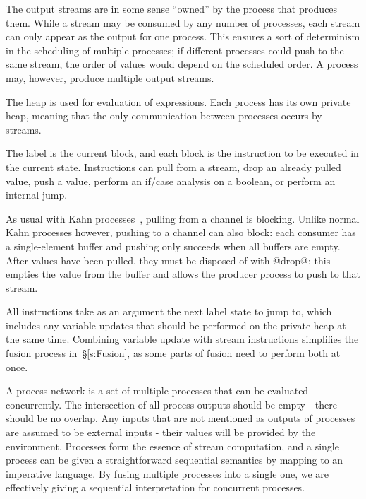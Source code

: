 The output streams are in some sense ``owned'' by the process that produces them.
While a stream may be consumed by any number of processes, each stream can only appear as the output for one process.
This ensures a sort of determinism in the scheduling of multiple processes; if different processes could push to the same stream, the order of values would depend on the scheduled order.
A process may, however, produce multiple output streams.

The heap is used for evaluation of expressions.
Each process has its own private heap, meaning that the only communication between processes occurs by streams.

The label is the current block, and each block is the instruction to be executed in the current state.
Instructions can pull from a stream, drop an already pulled value, push a value, perform an if/case analysis on a boolean, or perform an internal jump.

As usual with Kahn processes~\cite{kahn1976coroutines}, pulling from a channel is blocking.
Unlike normal Kahn processes however, pushing to a channel can also block: each consumer has a single-element buffer and pushing only succeeds when all buffers are empty.
After values have been pulled, they must be disposed of with @drop@: this empties the value from the buffer and allows the producer process to push to that stream.

All instructions take as an argument the next label state to jump to, which includes any variable updates that should be performed on the private heap at the same time.
Combining variable update with stream instructions simplifies the fusion process in~\S\ref{s:Fusion}, as some parts of fusion need to perform both at once.


A process network is a set of multiple processes that can be evaluated concurrently.
The intersection of all process outputs should be empty - there should be no overlap.
Any inputs that are not mentioned as outputs of processes are assumed to be external inputs - their values will be provided by the environment.
Processes form the essence of stream computation, and a single process can be given a straightforward sequential semantics by mapping to an imperative language.
By fusing multiple processes into a single one, we are effectively giving a sequential interpretation for concurrent processes.


